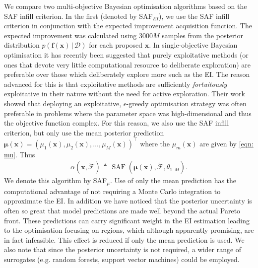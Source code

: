 \documentclass[conference]{IEEEtran}
\makeatletter
\newcommand{\nobj}{M}
\newcommand{\defn}{\triangleq}
\DeclareMathOperator*{\saf}{SAF}
\newcommand\safmu{SAF$_{\mu}$\xspace}
\newcommand\safei{SAF$_{EI}$\xspace}
\newcommand\ei{EI\xspace}
\newcommand\Fapprox{\tilde{\mathcal{F}}}
\newcommand{\trp}{^\top}
\newcommand{\given}{\,|\,}
\newcommand{\bx}{\mathbf{x}}
\newcommand{\bff}{\mathbf{f}}
\newcommand{\bmu}{\boldsymbol{\mu}}
\newcommand{\data}{\mathcal{D}}
\newcommand*{\eg}{e.g.\@\xspace}
\makeatother
\begin{document}
We compare two multi-objective Bayesian optimisation algorithms based on the SAF infill criterion.  In the first (denoted by \safei), we use the SAF infill criterion in conjunction with the expected improvement acquisition function. The expected improvement was calculated using $3000M$ samples from the posterior distribution $p(\bff(\bx) \given \data)$ for each proposed $\bx$.
In single-objective Bayesian optimisation it has recently been suggested that purely exploitative  methods (or ones that devote very little computational resource to deliberate exploration) are preferable over those which deliberately explore more such as the \ei \cite{death2019greed}. The reason advanced for this is that exploitative methods are sufficiently \textit{fortuitously} exploitative in their nature without the need for active exploration. Their work showed that deploying an exploitative, $\epsilon$-greedy optimisation strategy was often preferable in problems where the parameter space was high-dimensional and thus the objective function complex.  For this reason, we also use the SAF infill criterion, but only use the mean posterior prediction $\bmu(\bx) = (\mu_1(\bx), \mu_2(\bx),\ldots, \mu_\nobj(\bx))\trp$ where the $\mu_m(\bx)$ are given by \eqref{eqn: mu}.  Thus
\begin{align}
    \alpha(\bx, \Fapprox) \defn \saf(\bmu(\bx), \Fapprox, \theta_{1:M}).
\end{align}  
We denote this algorithm by \safmu.   Use of only the mean prediction has the computational advantage of not requiring a Monte Carlo integration to approximate the \ei. In addition we have noticed that the posterior uncertainty is often so great that model predictions are made well beyond the actual Pareto front. These predictions can carry significant weight in the \ei estimation leading to the optimisation focusing on regions, which although apparently promising, are in fact infeasible.  This effect is reduced if only the mean prediction is used.  We also note that since the posterior uncertainty is not required, a wider range of surrogates (\eg random forests, support vector machines) could be employed. 

\end{document}
